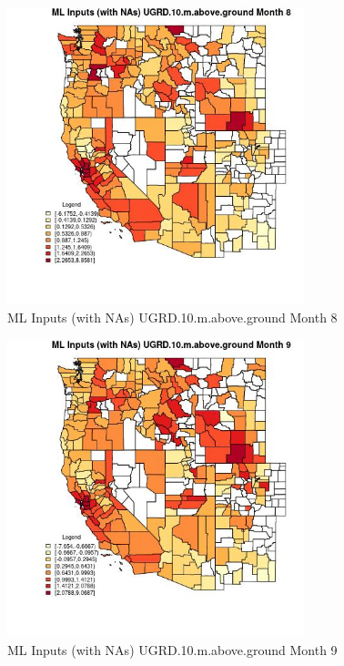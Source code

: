 \begin{figure} 
\centering  
\includegraphics[width=0.77\textwidth]{Code_Outputs/Report_ML_input_PM25_Step4_part_f_de_duplicated_aves_prioritize_24hr_obswNAs_CountyUGRD10mabovegroundmedianMonth8.jpg} 
\caption{\label{fig:Report_ML_input_PM25_Step4_part_f_de_duplicated_aves_prioritize_24hr_obswNAsCountyUGRD10mabovegroundmedianMonth8}ML Inputs (with NAs) UGRD.10.m.above.ground Month 8} 
\end{figure} 
 

\begin{figure} 
\centering  
\includegraphics[width=0.77\textwidth]{Code_Outputs/Report_ML_input_PM25_Step4_part_f_de_duplicated_aves_prioritize_24hr_obswNAs_CountyUGRD10mabovegroundmedianMonth9.jpg} 
\caption{\label{fig:Report_ML_input_PM25_Step4_part_f_de_duplicated_aves_prioritize_24hr_obswNAsCountyUGRD10mabovegroundmedianMonth9}ML Inputs (with NAs) UGRD.10.m.above.ground Month 9} 
\end{figure} 
 

